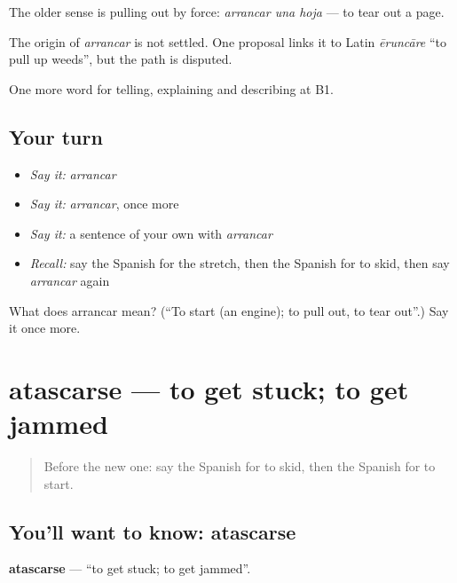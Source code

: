 The older sense is pulling out by force: \emph{arrancar una hoja} — to tear out a page.

\begin{cousinweb}
The origin of \emph{arrancar} is not settled. One proposal links it to Latin \emph{ēruncāre} \textquotedblleft{}to pull up weeds\textquotedblright{}, but the path is disputed.
\end{cousinweb}

\begin{grammarlens}[title={What you've built}]
One more word for telling, explaining and describing at B1.
\end{grammarlens}

\subsection*{Your turn}
\begin{itemize}
\raggedright
  \item \emph{Say it:} \emph{arrancar}
  \item \emph{Say it:} \emph{arrancar}, once more
  \item \emph{Say it:} a sentence of your own with \emph{arrancar}
  \item \emph{Recall:} say the Spanish for the stretch, then the Spanish for to skid, then say \emph{arrancar} again
\end{itemize}

\begin{tcolorbox}[breakable,colback=teal!4,colframe=teal!35!black,title={Before you move on}]
What does arrancar mean? (\textquotedblleft{}To start (an engine); to pull out, to tear out\textquotedblright{}.) Say it once more.
\end{tcolorbox}
\section[atascarse]{atascarse — to get stuck; to get jammed}

\label{lesson:ES-C643-atascarse}



\begin{quote}
Before the new one: say the Spanish for to skid, then the Spanish for to start.
\end{quote}

\subsection*{You'll want to know: atascarse}
\textbf{atascarse} — \textquotedblleft{}to get stuck; to get jammed\textquotedblright{}.

